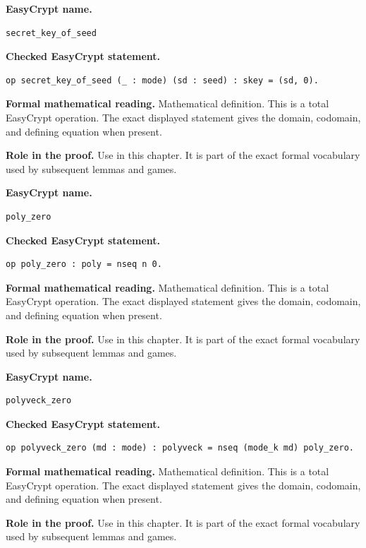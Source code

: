 \begin{formaldefinition}
\noindent\textbf{EasyCrypt name.}
\begin{lstlisting}[language=EasyCrypt,basicstyle=\ttfamily\scriptsize]
secret_key_of_seed
\end{lstlisting}
\noindent\textbf{Checked EasyCrypt statement.}
\begin{lstlisting}[language=EasyCrypt,basicstyle=\ttfamily\scriptsize]
op secret_key_of_seed (_ : mode) (sd : seed) : skey = (sd, 0).
\end{lstlisting}
\noindent\textbf{Formal mathematical reading.}
Mathematical definition. This is a total EasyCrypt operation.  The exact displayed statement gives the domain, codomain, and defining equation when present.

\noindent\textbf{Role in the proof.}
Use in this chapter. It is part of the exact formal vocabulary used by subsequent lemmas and games.

\end{formaldefinition}

\begin{formaldefinition}
\noindent\textbf{EasyCrypt name.}
\begin{lstlisting}[language=EasyCrypt,basicstyle=\ttfamily\scriptsize]
poly_zero
\end{lstlisting}
\noindent\textbf{Checked EasyCrypt statement.}
\begin{lstlisting}[language=EasyCrypt,basicstyle=\ttfamily\scriptsize]
op poly_zero : poly = nseq n 0.
\end{lstlisting}
\noindent\textbf{Formal mathematical reading.}
Mathematical definition. This is a total EasyCrypt operation.  The exact displayed statement gives the domain, codomain, and defining equation when present.

\noindent\textbf{Role in the proof.}
Use in this chapter. It is part of the exact formal vocabulary used by subsequent lemmas and games.

\end{formaldefinition}

\begin{formaldefinition}
\noindent\textbf{EasyCrypt name.}
\begin{lstlisting}[language=EasyCrypt,basicstyle=\ttfamily\scriptsize]
polyveck_zero
\end{lstlisting}
\noindent\textbf{Checked EasyCrypt statement.}
\begin{lstlisting}[language=EasyCrypt,basicstyle=\ttfamily\scriptsize]
op polyveck_zero (md : mode) : polyveck = nseq (mode_k md) poly_zero.
\end{lstlisting}
\noindent\textbf{Formal mathematical reading.}
Mathematical definition. This is a total EasyCrypt operation.  The exact displayed statement gives the domain, codomain, and defining equation when present.

\noindent\textbf{Role in the proof.}
Use in this chapter. It is part of the exact formal vocabulary used by subsequent lemmas and games.

\end{formaldefinition}

